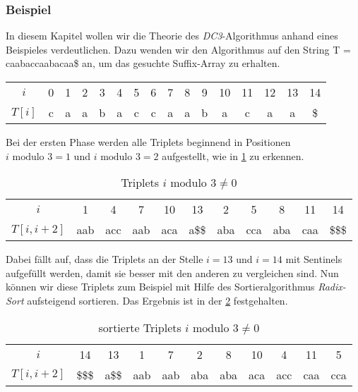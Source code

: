 \subsubsection{Beispiel}
\label{dc3:algorithmus:beispiel}


In diesem Kapitel wollen wir die Theorie des \emph{DC3}-Al\-go\-rith\-mus anhand eines Beispieles verdeutlichen. Dazu wenden wir den Al\-go\-rith\-mus auf den String T = caabaccaabacaa\$ an, um das gesuchte Suffix-Array zu erhalten.

\begin{table}[H]
	\centering
	\begin{tabular}{c| c c c c c c c c c c c c c c c}
		$i$ & 0 & 1 & 2 & 3 & 4 & 5 & 6 & 7 & 8 & 9 & 10 & 11 & 12 & 13 & 14 \\
		$T[i]$ & c & a & a & b & a & c & c & a & a & b & a & c & a & a & \$
	\end{tabular}
\end{table}

Bei der ersten Phase werden alle Triplets beginnend in Positionen\\$i \text{ modulo } 3 = 1$ und $i \text{ modulo } 3 = 2$ aufgestellt, wie in \cref{tab:unsortierteTriplets} zu erkennen.

\begin{table}[H]
	\centering
	\begin{tabular}{c| c c c c c ||  c c c c c }
		$i$ & 1 & 4 & 7 & 10 & 13 & 2 & 5 & 8 & 11 & 14\\
		$T[i, i+2]$ & aab & acc & aab & aca & a\$\$ & aba & cca & aba & caa & \$\$\$
	\end{tabular}
	\caption{Triplets $i \text{ modulo } 3 \neq 0$}
	\label{tab:unsortierteTriplets}
\end{table}

Dabei fällt auf, dass die Triplets an der Stelle $i = 13$ und $i = 14$ mit Sentinels aufgefüllt werden, damit sie besser mit den anderen zu vergleichen sind. Nun können wir diese Triplets zum Beispiel mit Hilfe des Sortieralgorithmus \emph{Radix-Sort} aufsteigend sortieren. Das Ergebnis ist in der \cref{tab:sortierteTriplets} festgehalten.

\begin{table}[H]
	\centering
	\begin{tabular}{c| c c c c c c c c c c}
		$i$ & 14 & 13 & 1 & 7 & 2 & 8 & 10 & 4 & 11 & 5\\
		$T[i, i+2]$ & \$\$\$ & a\$\$ & aab & aab & aba & aba & aca & acc & caa & cca 
	\end{tabular}
	\caption{sortierte Triplets $i \text{ modulo } 3 \neq 0$}
	\label{tab:sortierteTriplets}
\end{table}

